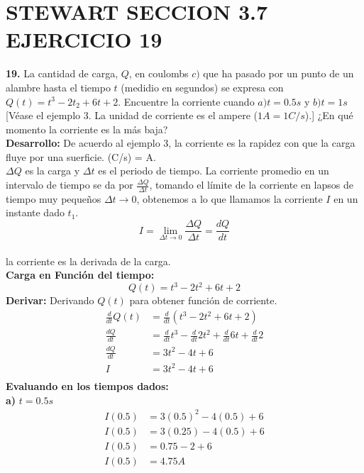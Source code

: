 \chapter*{STEWART SECCION 3.7 EJERCICIO 19}

\textbf{19.} La cantidad de carga, $Q$, en coulombs $c)$ que ha pasado por un punto de un alambre hasta el tiempo $t$ (medidio en segundos) se expresa con $Q(t) = t^{3} - 2t_{2} + 6t +2$. Encuentre la corriente cuando $ a) t = 0.5s$ y $b) t = 1s$ [Véase el ejemplo 3. La unidad de corriente es el ampere ($1A = 1C/s$).] ¿En qué momento la corriente es la más baja?\\
\newline
\textbf{Desarrollo:}\newline
De acuerdo al ejemplo 3, la corriente es la rapidez con que la carga fluye por una suerficie. (C/s) = A.\\
\newline
$\Delta Q$ es la carga y $\Delta t$ es el periodo de tiempo. La corriente promedio en un intervalo de tiempo se da por $\frac{\Delta Q}{\Delta t}$, tomando el límite de la corriente en lapsos de tiempo muy pequeños $\Delta t \rightarrow 0$, obtenemos a lo que llamamos la corriente $I$ en un instante dado $t_{1}$.\\
\newline
\[
I = \lim_{\Delta t \to 0 }{\frac{\Delta Q}{\Delta t}} = \frac{dQ}{dt}
\] \\
la corriente es la derivada de la carga.\\
\newline
\textbf{Carga en Función del tiempo:}
\[
Q(t) = t^{3} - 2t^{2} + 6t + 2 
\]
\textbf{Derivar: }Derivando $Q(t)$ para obtener función de corriente.
\begin{align*}
    \frac{d}{dt}Q(t) &= \frac{d}{dt}(t^{3}-2t^{2}+6t+2)\\
    \frac{dQ}{dt} &= \frac{d}{dt}t^{3} - \frac{d}{dt}2t^{2} + \frac{d}{dt}6t + \frac{d}{dt}2\\
    \frac{dQ}{dt} &= 3t^{2} - 4t +6\\
    I &= 3t^{2} - 4t +6\\
\end{align*}
\textbf{Evaluando en los tiempos dados:}\\
\newline
\textbf{a)} $t = 0.5 s$
\begin{align*}
    I(0.5) &= 3(0.5)^{2} - 4(0.5) +6\\
    I(0.5) &= 3(0.25) - 4(0.5) +6\\
    I(0.5) &= 0.75 - 2 +6\\
    I(0.5) &= 4.75 A\\
\end{align*}
